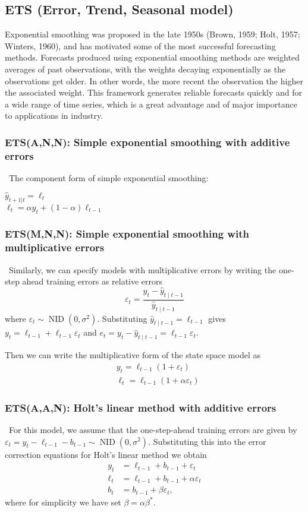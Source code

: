 \documentclass{ieeeojies}
\begin{document}
\subsection{ETS (Error, Trend, Seasonal model)}
Exponential smoothing was proposed in the late 1950s (Brown, 1959; Holt, 1957; Winters, 1960), and has motivated some of the most successful forecasting methods. Forecasts produced using exponential smoothing methods are weighted averages of past observations, with the weights decaying exponentially as the observations get older. In other words, the more recent the observation the higher the associated weight. This framework generates reliable forecasts quickly and for a wide range of time series, which is a great advantage and of major importance to applications in industry. 
\subsubsection{ETS(A,N,N): Simple exponential smoothing with additive errors} \
The component form of simple exponential smoothing:\
\begin{center}

    $\hat{y}_{t+1|t} = \ell_t$ \\
    $\ell_t = \alpha y_t + (1 - \alpha)\ell_{t-1} $\\
\end{center}
\subsubsection{ETS(M,N,N): Simple exponential smoothing with multiplicative errors} \
Similarly, we can specify models with multiplicative errors by writing the one-step ahead training errors as relative errors
$$
\varepsilon_t=\frac{y_t-\hat{y}_{t \mid t-1}}{\hat{y}_{t \mid t-1}}
$$
where $\varepsilon_t \sim \operatorname{NID}\left(0, \sigma^2\right)$. Substituting $\hat{y}_{t \mid t-1}=\ell_{t-1}$ gives $y_t=\ell_{t-1}+\ell_{t-1} \varepsilon_t$ and $e_t=y_t-\hat{y}_{t \mid t-1}=\ell_{t-1} \varepsilon_t$.

Then we can write the multiplicative form of the state space model as
$$
\begin{aligned}
& y_t=\ell_{t-1}\left(1+\varepsilon_t\right) \\
& \ell_t=\ell_{t-1}\left(1+\alpha \varepsilon_t\right)
\end{aligned}
$$
\subsubsection{ETS(A,A,N): Holt’s linear method with additive errors} \
For this model, we assume that the one-step-ahead training errors are given by $\varepsilon_t=y_t-\ell_{t-1}-b_{t-1} \sim \operatorname{NID}\left(0, \sigma^2\right)$. Substituting this into the error correction equations for Holt's linear method we obtain
$$
\begin{aligned}
y_t & =\ell_{t-1}+b_{t-1}+\varepsilon_t \\
\ell_t & =\ell_{t-1}+b_{t-1}+\alpha \varepsilon_t \\
b_t & =b_{t-1}+\beta \varepsilon_t,
\end{aligned}
$$
where for simplicity we have set $\beta=\alpha \beta^*$.
\end{document}
